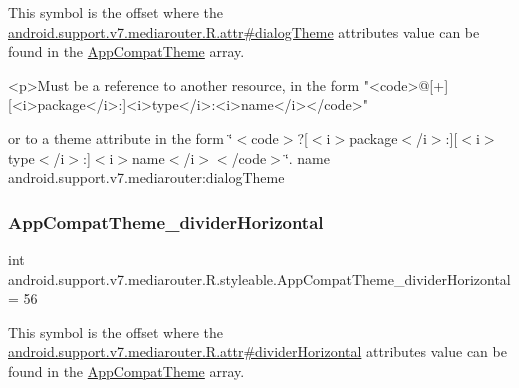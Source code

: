 This symbol is the offset where the \hyperlink{classandroid_1_1support_1_1v7_1_1mediarouter_1_1R_1_1attr_a2f9840e6a4c028c1cad08bae7f0ee960}{android.\+support.\+v7.\+mediarouter.\+R.\+attr\#dialog\+Theme} attribute\textquotesingle{}s value can be found in the \hyperlink{classandroid_1_1support_1_1v7_1_1mediarouter_1_1R_1_1styleable_a4e3d3900c75d49aeb2f283cac00214d6}{App\+Compat\+Theme} array.

\begin{DoxyVerb}      <p>Must be a reference to another resource, in the form "<code>@[+][<i>package</i>:]<i>type</i>:<i>name</i></code>"
\end{DoxyVerb}
 or to a theme attribute in the form \char`\"{}$<$code$>$?\mbox{[}$<$i$>$package$<$/i$>$\+:\mbox{]}\mbox{[}$<$i$>$type$<$/i$>$\+:\mbox{]}$<$i$>$name$<$/i$>$$<$/code$>$\char`\"{}.  name android.\+support.\+v7.\+mediarouter\+:dialog\+Theme \mbox{\label{classandroid_1_1support_1_1v7_1_1mediarouter_1_1R_1_1styleable_af1934692686e513b4d05797f7f21f7c8}} 
\subsubsection{\texorpdfstring{App\+Compat\+Theme\+\_\+divider\+Horizontal}{AppCompatTheme\_dividerHorizontal}}
{\footnotesize\ttfamily int android.\+support.\+v7.\+mediarouter.\+R.\+styleable.\+App\+Compat\+Theme\+\_\+divider\+Horizontal = 56\hspace{0.3cm}{\ttfamily [static]}}

This symbol is the offset where the \hyperlink{classandroid_1_1support_1_1v7_1_1mediarouter_1_1R_1_1attr_ab722068c962f9a2b375b02825173ff58}{android.\+support.\+v7.\+mediarouter.\+R.\+attr\#divider\+Horizontal} attribute\textquotesingle{}s value can be found in the \hyperlink{classandroid_1_1support_1_1v7_1_1mediarouter_1_1R_1_1styleable_a4e3d3900c75d49aeb2f283cac00214d6}{App\+Compat\+Theme} array.


